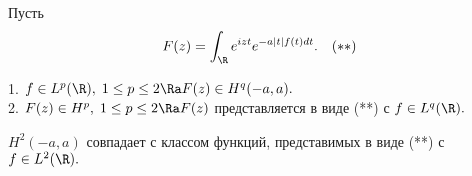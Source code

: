\documentclass[a4paper]{article}
\begin{document}
Пусть
$$F(z)=\int_{\R }e^{izt}e^{-a|t|f(t)dt}.\quad(**)$$

\begin{theorem}
1. $f\in L^p(\R ),\;1\le p\le2\Ra F(z)\in H^q(-a,a).$\\\hangindent=2.5cm 2. $F(z)\in
H^p,\;1\le p\le2\Ra F(z)$ представляется в виде (**) с $f\in L^q(\R ).$
\end{theorem}

\begin{theorem}
$H^2(-a,a)$ совпадает с классом функций, представимых в виде (**) с $f\in L^2(\R).$
\end{theorem}
\end{document}
